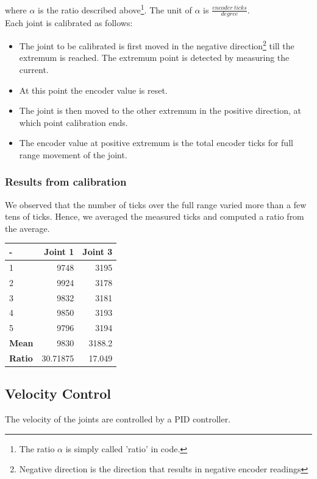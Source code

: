 \documentclass[10pt,a4paper]{article}
\begin{document}
where \(\alpha\) is the ratio described above\footnote{The ratio
  \(\alpha\) is simply called 'ratio' in code.}. The unit of
\(\alpha\) is \( \frac{encoder\ ticks}{degree}\). \\


Each joint is calibrated as follows:
\begin{itemize}
\item The joint to be calibrated is first moved in the negative
  direction\footnote{Negative direction is the direction that results
    in negative encoder readings} till the extremum is reached. The
  extremum point is detected by measuring the current.
\item At this point the encoder value is reset. 
\item The joint is then moved to the other extremum in the positive
  direction, at which point calibration ends.
\item The encoder value at positive extremum is the total encoder
  ticks for full range movement of the joint.
\end{itemize}

\subsubsection{Results from calibration}

We observed that the number of ticks over the full range varied more
than a few tens of ticks. Hence, we averaged the measured ticks and
computed a ratio from the average. \\ 

\begin{tabular}{ | l | r | r |}
\hline
- & \textbf{Joint 1} & \textbf{Joint 3} \\
\hline
1 & 9748 & 3195 \\
\hline
2 & 9924 & 3178 \\
\hline
3 & 9832 & 3181 \\
\hline
4 & 9850 & 3193 \\
\hline
5 & 9796 & 3194 \\
\hline
\textbf{Mean} & 9830 & 3188.2 \\
\hline
\textbf{Ratio} & 30.71875 & 17.049 \\
\hline

\end{tabular}

\subsection{Velocity Control}
The velocity of the joints are controlled by a PID controller. 
\end{document}
